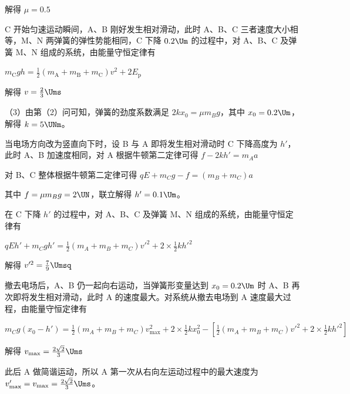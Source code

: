 \documentclass[\gkver]{gaokaozhenti}
\begin{document}
\begin{enumerate}
{解得 $\mu = 0.5$

C 开始匀速运动瞬间，A、B 刚好发生相对滑动，此时 A、B、C 三者速度大小相等，M、N 两弹簧的弹性势能相同，C 下降 $0.2 \Um$ 的过程中，对 A、B、C 及弹簧 M、N 组成的系统，由能量守恒定律有

$m_{\mathrm{C}}gh = \frac{1}{2}(m_{\mathrm{A}} + m_{\mathrm{B}} + m_{\mathrm{C}})v^{2} + 2E_{\mathrm{p}}$

解得 $v = \frac{2}{3} \Ums$

（3）由第（2）问可知，弹簧的劲度系数满足 $2kx_{0} = \mu m_{B}g$，其中 $x_{0} = 0.2 \Um$，解得 $k = 5 \UNm$。

当电场方向改为竖直向下时，设 B 与 A 即将发生相对滑动时 C 下降高度为 $h'$，此时 A、B 加速度相同，对 A 根据牛顿第二定律可得 $f - 2kh' = m_{A}a$

对 B、C 整体根据牛顿第二定律可得 $qE + m_{C}g - f = (m_{B} + m_{C})a$

其中 $f = \mu m_{B}g = 2 \UN$，联立解得 $h' = 0.1 \Um$。

在 C 下降 $h'$ 的过程中，对 A、B、C 及弹簧 M、N 组成的系统，由能量守恒定律有

$qEh' + m_{C}gh' = \frac{1}{2}(m_{A} + m_{B} + m_{C})v'^{2} + 2 \times \frac{1}{2}kh'^{2}$

解得 $v'^{2} = \frac{7}{9} \Umsq$

撤去电场后，A、B 仍一起向右运动，当弹簧形变量达到 $x_{0} = 0.2 \Um$ 时 A、B 再次即将发生相对滑动，此时 A 的速度最大。对系统从撤去电场到 A 速度最大过程，由能量守恒定律有

$m_{C}g(x_{0} - h') = \frac{1}{2}(m_{A} + m_{B} + m_{C})v_{\text{max}}^{2} + 2 \times \frac{1}{2}kx_{0}^{2} - \left[\frac{1}{2}(m_{A} + m_{B} + m_{C})v'^{2} + 2 \times \frac{1}{2}kh'^{2}\right]$

解得 $v_{\text{max}} = \frac{2\sqrt{2}}{3} \Ums$

此后 A 做简谐运动，所以 A 第一次从右向左运动过程中的最大速度为 $v_{\text{max}}' = v_{\text{max}} = \frac{2\sqrt{2}}{3} \Ums$。
}

\end{enumerate}
\end{document}
